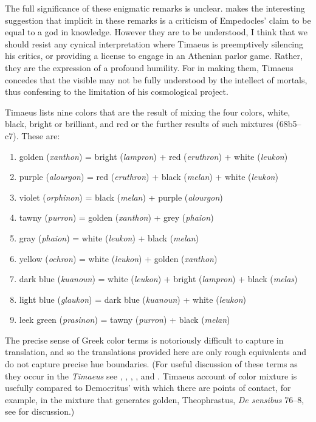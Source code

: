 The full significance of these enigmatic remarks is unclear. \citet[173--4]{Brisson:1997qr} makes the interesting suggestion that implicit in these remarks is a criticism of Empedocles' claim to be equal to a god in knowledge. However they are to be understood, I think that we should resist any cynical interpretation where Timaeus is preemptively silencing his critics, or providing a license to engage in an Athenian parlor game. Rather, they are the expression of a profound humility. For in making them, Timaeus concedes that the visible may not be fully understood by the intellect of mortals, thus confessing to the limitation of his cosmological project.

Timaeus lists nine colors that are the result of mixing the four colors, white, black, bright or brilliant, and red or the further results of such mixtures (68b5--c7). These are:
\begin{enumerate}
	\item golden (\emph{xanthon}) = bright (\emph{lampron}) + red (\emph{eruthron}) + white (\emph{leukon})
	\item purple (\emph{alourgon}) = red (\emph{eruthron}) + black (\emph{melan}) + white (\emph{leukon})
	\item violet (\emph{orphinon}) = black (\emph{melan}) + purple (\emph{alourgon})
	\item tawny (\emph{purron}) = golden (\emph{xanthon}) + grey (\emph{phaion})
	\item gray (\emph{phaion}) = white (\emph{leukon}) + black (\emph{melan})
	\item yellow (\emph{ochron}) = white (\emph{leukon}) + golden (\emph{xanthon})
	\item dark blue (\emph{kuanoun}) = white (\emph{leukon}) + bright (\emph{lampron}) + black (\emph{melas})
	\item light blue (\emph{glaukon}) = dark blue (\emph{kuanoun}) + white (\emph{leukon})
	\item leek green (\emph{prasinon}) = tawny (\emph{purron}) + black (\emph{melan})
\end{enumerate}
The precise sense of Greek color terms is notoriously difficult to capture in translation, and so the translations provided here are only rough equivalents and do not capture precise hue boundaries. (For useful discussion of these terms as they occur in the \emph{Timaeus} see \citet{Platnauer:1921bh}, \citet[483--5]{Taylor:1928qb}, \citet[chapter 10]{Bruno:1977fk}, \citet{Levides:2002aa}, and \citet{Struycken:2003zr}. Timaeus account of color mixture is usefully compared to Democritus' with which there are points of contact, for example, in the mixture that generates golden, Theophrastus, \emph{De sensibus} 76--8, see \citealt{Struycken:2003zr} for discussion.)

